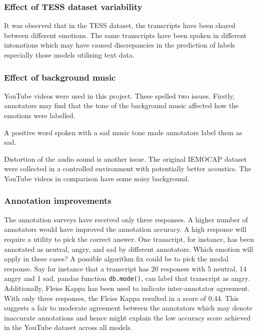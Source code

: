 \documentclass{article}
\begin{document}
    \subsubsection*{Effect of TESS dataset variability}
        It was observed that in the TESS dataset, the transcripts have been shared between different emotions. The same transcripts have been spoken in different intonations which may have caused discrepancies in the prediction of labels especially those models utilising text data.\par
    
    \subsubsection*{Effect of background music}
        YouTube videos were used in this project. These spelled two issues.  Firstly, annotators may find that the tone of the background music affected how the emotions were labelled.\par
        
        A positive word spoken with a sad music tone made annotators label them as sad.\par

        Distortion of the audio sound is another issue. The original IEMOCAP dataset were collected in a controlled environment with potentially better acoustics. The YouTube videos in comparison have some noisy background.\par
        
    \subsubsection*{Annotation improvements}
        The annotation surveys have received only three responses.  A higher number of annotators would have improved the annotation accuracy. A high response will require a utility to pick the correct answer.  One transcript, for instance, has been annotated as neutral, angry, and sad by different annotators.  Which emotion will apply in these cases?  A possible algorithm fix could be to pick the modal response. Say for instance that a transcript has 20 responses with 5 neutral, 14 angry and 1 sad, pandas function \verb|db.mode()|, can label that transcript as angry.
        Additionally, Fleiss Kappa has been used to indicate inter-annotator agreement. With only three responses, the Fleiss Kappa resulted in a score of 0.44. This suggests a fair to moderate agreement \cite{fleisskappa} between the annotators which may denote inaccurate annotations and hence might explain the low accuracy score achieved in the YouTube dataset across all models.\par
\end{document}
